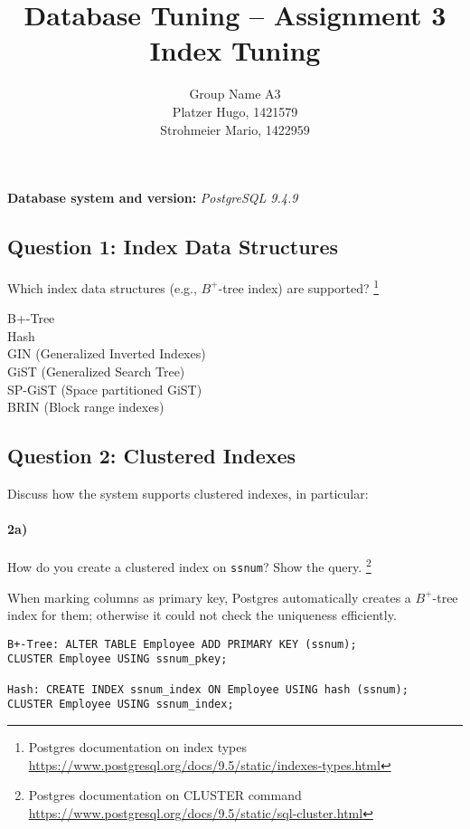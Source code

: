\documentclass[11pt]{scrartcl}
\title{
  \textbf{\large Database Tuning -- Assignment 3}\\
  Index Tuning
}
\author{
 Group Name A3\\
 \large Platzer Hugo, 1421579 \\
 \large Strohmeier Mario, 1422959
}
\begin{document}
\maketitle

\medskip

\noindent\textbf{Database system and version:} {\it PostgreSQL 9.4.9}

\subsection*{Question 1: Index Data Structures} Which index data structures (e.g., $B^+$-tree
index) are supported?
\footnote{Postgres documentation on index types \url{https://www.postgresql.org/docs/9.5/static/indexes-types.html}}

\vspace{1em}
B+-Tree\\
Hash\\
GIN (Generalized Inverted Indexes)\\
GiST (Generalized Search Tree)\\
SP-GiST (Space partitioned GiST)\\
BRIN (Block range indexes)

\subsection*{Question 2: Clustered Indexes} Discuss how the system
supports clustered indexes, in particular:

\paragraph{2a)} How do you create a clustered index on {\tt ssnum}?
Show the query.
\footnote{\label{pdoc:cluster} Postgres documentation on CLUSTER command \url{https://www.postgresql.org/docs/9.5/static/sql-cluster.html}}

\vspace{1em}
When marking columns as primary key, Postgres automatically creates
a $B^+$-tree index for them; otherwise it could not check the uniqueness
efficiently.

{\small
\begin{verbatim}
B+-Tree: ALTER TABLE Employee ADD PRIMARY KEY (ssnum);
CLUSTER Employee USING ssnum_pkey;

Hash: CREATE INDEX ssnum_index ON Employee USING hash (ssnum);
CLUSTER Employee USING ssnum_index;
\end{verbatim}
}
\end{document}
